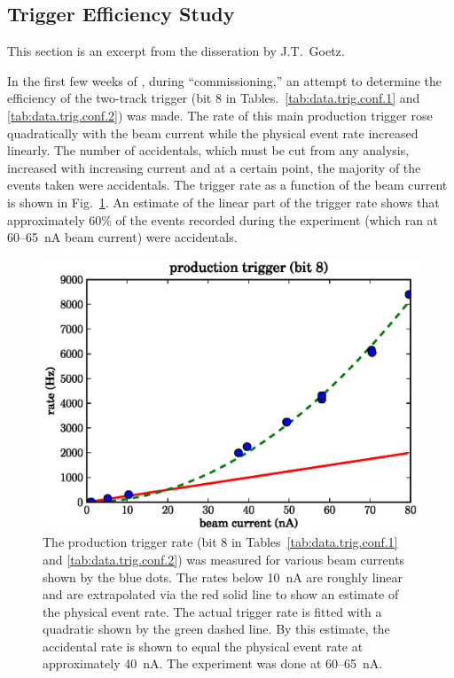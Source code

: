 
\subsection{\label{sec:data.trig.eff}Trigger Efficiency Study}

\begin{center} \color{OliveGreen}
This section is an excerpt from the disseration by J.T.\ Goetz\cite{clas.thesis.goetz}.
\end{center}

In the first few weeks of , during ``commissioning,'' an attempt to determine the efficiency of the two-track trigger (bit 8 in Tables.~\ref{tab:data.trig.conf.1} and \ref{tab:data.trig.conf.2}) was made. The rate of this main production trigger rose quadratically with the beam current while the physical event rate increased linearly. The number of accidentals, which must be cut from any analysis, increased with increasing current and at a certain point, the majority of the events taken were accidentals. The trigger rate as a function of the beam current is shown in Fig.~\ref{fig:data.trig.eff}. An estimate of the linear part of the trigger rate shows that approximately 60\% of the events recorded during the  experiment (which ran at 60--65~nA beam current) were accidentals.

\begin{figure}\begin{center}
\includegraphics[width=0.7\columnwidth]{figures/calibration/trigger/trigger_study.eps}
\caption[Trigger Rate vs. Beam Current]{\label{fig:data.trig.eff}The production trigger rate (bit 8 in Tables~\ref{tab:data.trig.conf.1} and \ref{tab:data.trig.conf.2}) was measured for various beam currents shown by the blue dots. The rates below 10~nA are roughly linear and are extrapolated via the red solid line to show an estimate of the physical event rate. The actual trigger rate is fitted with a quadratic shown by the green dashed line. By this estimate, the accidental rate is shown to equal the physical event rate at approximately 40~nA. The  experiment was done at 60--65~nA.}
\end{center}\end{figure}

\clearpage
